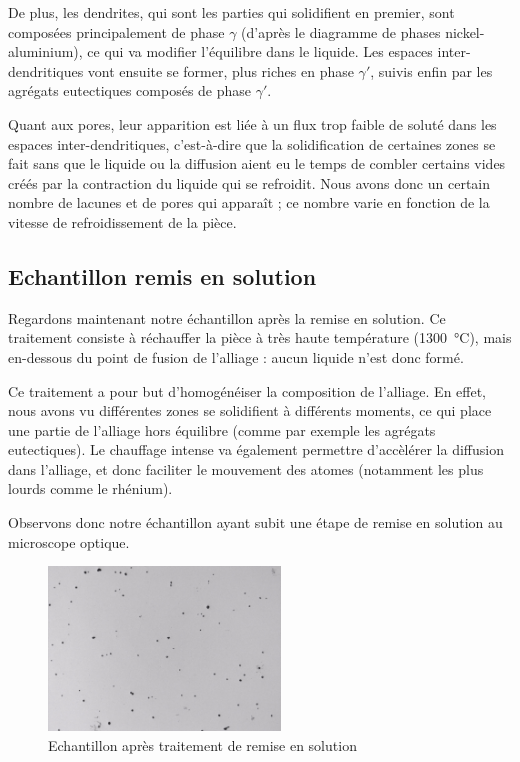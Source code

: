 
De plus, les dendrites, qui sont les parties qui solidifient en premier, sont composées 
principalement de phase $\gamma$ (d'après le diagramme de phases nickel-aluminium), 
ce qui va modifier l'équilibre dans le liquide.
Les espaces inter-dendritiques vont ensuite se former,  plus riches en phase $\gamma'$, 
suivis enfin par les agrégats eutectiques composés de phase $\gamma'$.

Quant aux pores, leur apparition est liée à un flux trop faible de soluté 
dans les espaces inter-dendritiques, c'est-à-dire que la solidification de 
certaines zones se fait sans que le liquide ou la diffusion aient eu le 
temps de combler certains vides créés par la contraction du liquide qui
se refroidit. Nous avons donc un certain nombre de lacunes et de pores qui
apparaît ; ce nombre varie en fonction de la vitesse de refroidissement 
de la pièce.


\subsection*{Echantillon remis en solution}

Regardons maintenant notre échantillon après la remise en solution. 
Ce traitement consiste à réchauffer la pièce à très haute température (\SI{1300}{\celsius}),
mais en-dessous du point de fusion de l'alliage : aucun liquide n'est donc formé. 

Ce traitement a pour but d'homogénéiser la composition de l'alliage. En effet, nous avons 
vu différentes zones se solidifient à différents moments, ce qui place une partie de l'alliage
hors équilibre (comme par exemple les agrégats eutectiques). Le chauffage intense va également 
permettre d'accèlérer la diffusion dans l'alliage, et donc faciliter le mouvement des atomes 
(notamment les plus lourds comme le rhénium). 

Observons donc notre échantillon ayant subit une étape de remise en solution au microscope optique.

\begin{figure}[htbp]
    \centering
    \includegraphics[width=0.55\textwidth]{images_optique/res.pdf}
    \caption{Echantillon après traitement de remise en solution}
    \label{<label>}
\end{figure}

